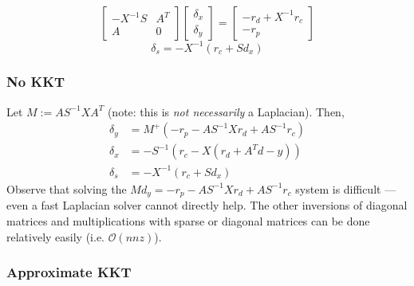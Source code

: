 \documentclass[10pt,a4paper]{article}
\newcommand{\Oo}{\mathcal{O}}
\begin{document}
$$\begin{bmatrix}-X^{-1}S & A^T \\ A & 0\end{bmatrix}
\begin{bmatrix}\delta_x \\ \delta_y\end{bmatrix} = 
\begin{bmatrix}-r_d + X^{-1}r_c \\ -r_p\end{bmatrix}$$
$$\delta_s = -X^{-1}(r_c + Sd_x)$$

\subsubsection{No KKT}

Let $M := AS^{-1}XA^T$ (note: this is \emph{not necessarily} a Laplacian). Then,
\begin{align*}
\delta_y &= M^+(-r_p - AS^{-1}Xr_d + AS^{-1}r_c) \\
\delta_x &= -S^{-1}(r_c - X(r_d + A^Td-y))\\
\delta_s &= -X^{-1}(r_c + Sd_x)
\end{align*}
Observe that solving the $Md_y = -r_p - AS^{-1}Xr_d + AS^{-1}r_c$ system is difficult --- even a fast Laplacian solver cannot directly help. The other inversions of diagonal matrices and multiplications with sparse or diagonal matrices can be done relatively easily (i.e. $\Oo(nnz)$).

\subsubsection{Approximate KKT}
\end{document}
